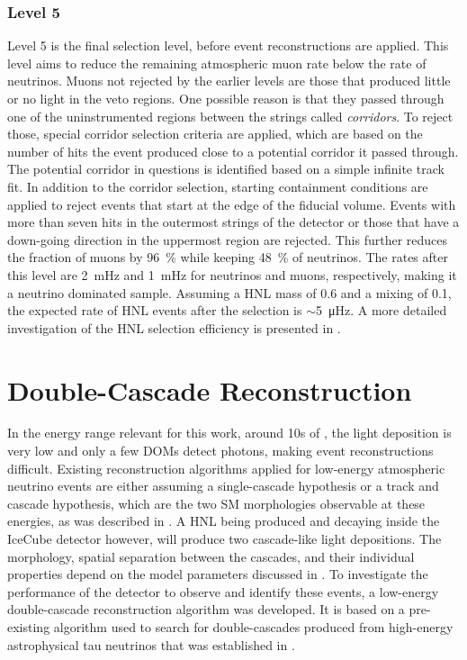 \subsubsection{Level 5} 

Level 5 is the final selection level, before event reconstructions are applied. This level aims to reduce the remaining atmospheric muon rate below the rate of neutrinos. Muons not rejected by the earlier levels are those that produced little or no light in the veto regions. One possible reason is that they passed through one of the uninstrumented regions between the strings called \textit{corridors}. To reject those, special corridor selection criteria are applied, which are based on the number of hits the event produced close to a potential corridor it passed through. The potential corridor in questions is identified based on a simple infinite track fit. In addition to the corridor selection, starting containment conditions are applied to reject events that start at the edge of the fiducial volume. Events with more than seven hits in the outermost strings of the detector or those that have a down-going direction in the uppermost region are rejected. This further reduces the fraction of muons by \SI{96}{\percent} while keeping \SI{48}{\percent} of neutrinos. The rates after this level are \SI{2}{\milli\hertz} and \SI{1}{\milli\hertz} for neutrinos and muons, respectively, making it a neutrino dominated sample. Assuming a HNL mass of \SI{0.6}{\gev} and a mixing of 0.1, the expected rate of HNL events after the selection is $\sim$\SI{5}{\micro\hertz}. A more detailed investigation of the HNL selection efficiency is presented in .


\section{Double-Cascade Reconstruction} 

In the energy range relevant for this work, around 10s of \si{\gev}, the light deposition is very low and only a few DOMs detect photons, making event reconstructions difficult. Existing reconstruction algorithms applied for low-energy atmospheric neutrino events are either assuming a single-cascade hypothesis or a track and cascade hypothesis, which are the two SM morphologies observable at these energies, as was described in . A HNL being produced and decaying inside the IceCube detector however, will produce two cascade-like light depositions. The morphology, spatial separation between the cascades, and their individual properties depend on the model parameters discussed in . To investigate the performance of the detector to observe and identify these events, a low-energy double-cascade reconstruction algorithm was developed. It is based on a pre-existing algorithm used to search for double-cascades produced from high-energy astrophysical tau neutrinos  that was established in .


